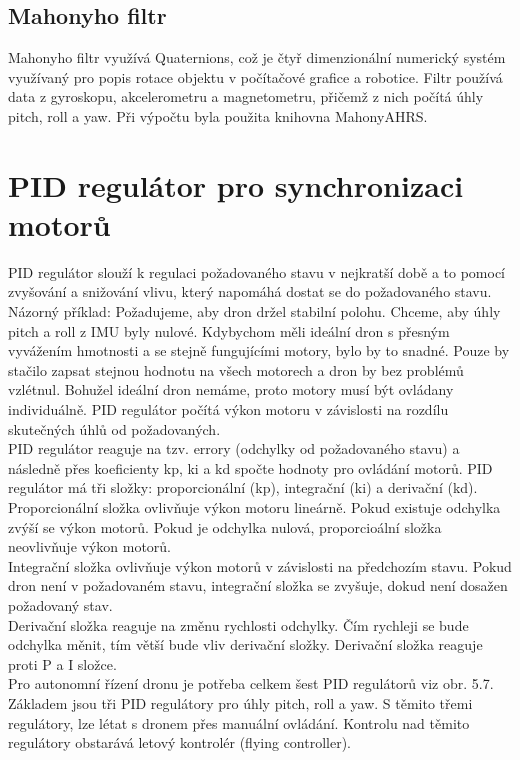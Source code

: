 \subsection{Mahonyho filtr}
Mahonyho filtr využívá Quaternions, což je čtyř dimenzionální numerický systém využívaný pro popis rotace objektu v počítačové grafice a robotice. Filtr používá data z gyroskopu, akcelerometru a magnetometru, přičemž z nich počítá úhly pitch, roll a yaw. Při výpočtu byla použita knihovna MahonyAHRS. \cite{mahony}\\

\section{PID regulátor pro synchronizaci motorů} 
PID regulátor slouží k regulaci požadovaného stavu v nejkratší době a to pomocí zvyšování a snižování vlivu, který napomáhá dostat se do požadovaného stavu.\\
Názorný příklad:
Požadujeme, aby dron držel stabilní polohu. Chceme, aby úhly pitch a roll z IMU byly nulové. Kdybychom měli ideální dron s přesným vyvážením hmotnosti a se stejně fungujícími motory, bylo by to snadné. Pouze by stačilo zapsat stejnou hodnotu na všech motorech a dron by bez problémů vzlétnul. Bohužel ideální dron nemáme, proto motory musí být ovládany individuálně. PID regulátor počítá výkon motoru v závislosti na rozdílu skutečných úhlů od požadovaných.\\
PID regulátor reaguje na tzv. errory (odchylky od požadovaného stavu) a následně přes koeficienty kp, ki a kd spočte hodnoty pro ovládání motorů.
PID regulátor má tři složky: proporcionální (kp), integrační (ki) a derivační (kd).\\
Proporcionální složka ovlivňuje výkon motoru lineárně. Pokud existuje odchylka zvýší se výkon motorů. Pokud je odchylka nulová, proporcioální složka neovlivňuje výkon motorů.\\
Integrační složka ovlivňuje výkon motorů v závislosti na předchozím stavu. Pokud dron není v požadovaném stavu, integrační složka se zvyšuje, dokud není dosažen požadovaný stav.\\
Derivační složka reaguje na změnu rychlosti odchylky. Čím rychleji se bude odchylka měnit, tím větší bude vliv derivační složky. Derivační složka reaguje proti P a I složce.\\
Pro autonomní řízení dronu je potřeba celkem šest PID regulátorů viz obr. 5.7. Základem jsou tři PID regulátory pro úhly pitch, roll a yaw. S těmito třemi regu\-látory, lze létat s dronem přes manuální ovládání. Kontrolu  nad těmito regulátory obstarává letový kontrolér (flying controller).\\
